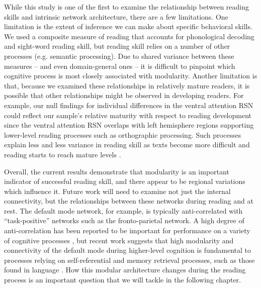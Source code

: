 While this study is one of the first to examine the relationship between reading skills and intrinsic network architecture, there are a few limitations. One limitation is the extent of inference we can make about specific behavioral skills. We used a composite measure of reading that accounts for phonological decoding and sight-word reading skill, but reading skill relies on a number of other processes (e.g. semantic processing). Due to shared variance between these measures -- and even domain-general ones -- it is difficult to pinpoint which cognitive process is most closely associated with modularity. Another limitation is that, because we examined these relationships in relatively mature readers, it is possible that other relationships might be observed in developing readers. For example, our null findings for individual differences in the ventral attention RSN could reflect our sample's relative maturity with respect to reading development since the ventral attention RSN overlaps with left hemisphere regions supporting lower-level reading processes such as orthographic processing. Such processes explain less and less variance in reading skill as texts become more difficult and reading starts to reach mature levels \citep{Cutting2006a}. 

Overall, the current results demonstrate that modularity is an important indicator of successful reading skill, and there appear to be regional variations which influence it. Future work will need to examine not just the internal connectivity, but the relationships between these networks during reading and at rest. The default mode network, for example, is typically anti-correlated with ``task-positive'' networks such as the fronto-parietal network. A high degree of anti-correlation has been reported to be important for performance on a variety of cognitive processes \citep{Fox2005, Keller2015}, but recent work suggests that high modularity and connectivity of the default mode during higher-level cognition is fundamental to processes relying on self-referential and memory retrieval processes, such as those found in language \citep{Vatansever2015}. How this modular architecture changes during the reading process is an important question that we will tackle in the following chapter. 
